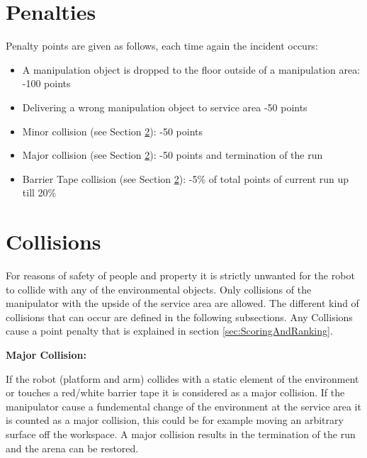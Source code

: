 \section{Penalties}
\label{sec:penalties}
Penalty points are given as follows, each time again the incident occurs:

\begin{itemize}
	\item A manipulation object is dropped to the floor outside of a manipulation area: \hfill -100 points
	\item Delivering a wrong manipulation object to service area \hfill -50 points
	\item Minor collision (see Section \ref{sec:Collisions}): \hfill -50 points
	\item Major collision (see Section \ref{sec:Collisions}): \hfill -50 points and termination of the run
  \item Barrier Tape collision (see Section \ref{sec:Collisions}): \hfill -5\% of total points of current run up till
  20\%
\end{itemize}


\section{Collisions}\label{sec:Collisions}

For reasons of safety of people and property it is strictly unwanted for the robot to collide
with any of the environmental objects. Only collisions of the manipulator with the upside of
the service area are allowed. The different kind of collisions that can occur are defined in the
following subsections. Any Collisions cause a point penalty that is explained in section \ref{sec:ScoringAndRanking}.  

\textbf{Major Collision:}

If the robot (platform and arm) collides with a static element of the environment or touches a red/white barrier tape it is considered as a major collision. If the manipulator cause a fundemental change of the environment at the service area it is counted as a major collision, this could be for example moving an arbitrary surface off the workspace. A major collision results in the termination of the run and the arena can be restored. 


